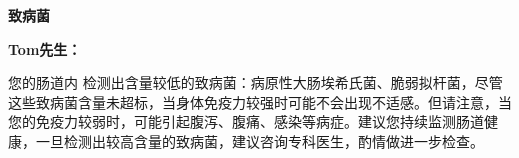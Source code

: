 

\usepackage{graphicx}
\graphicspath{{cores/}}



\setlength{\arrayrulewidth}{0.5pt}
\fontsize{9.3pt}{17pt}\selectfont
\color{gray2}

\vspace*{0mm}
\begin{center}
{\bf\sanhao 致病菌}
\end{center}

\medskip

\noindent
{\bf\xiaosihao Tom先生：}


\bigskip


您的肠道内
检测出含量较低的致病菌：病原性大肠埃希氏菌、脆弱拟杆菌，尽管这些致病菌含量未超标，当身体免疫力较强时可能不会出现不适感。但请注意，当您的免疫力较弱时，可能引起腹泻、腹痛、感染等病症。建议您持续监测肠道健康，一旦检测出较高含量的致病菌，建议咨询专科医生，酌情做进一步检查。

